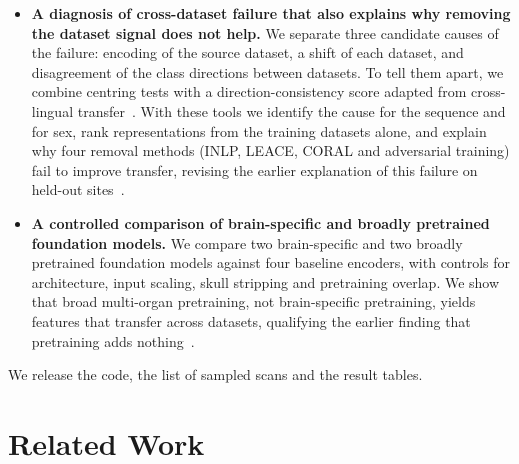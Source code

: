 \documentclass[11pt]{article}
\begin{document}
\begin{itemize}
  \item \textbf{A diagnosis of cross-dataset failure that also explains why
  removing the dataset signal does not help.} We separate three candidate
  causes of the failure: encoding of the source dataset, a shift of each
  dataset, and disagreement of the class directions between datasets. To tell
  them apart, we combine centring tests with a direction-consistency score
  adapted from cross-lingual transfer~\cite{muller_first_2021,
  deshpande_when_2022}. With these tools we identify the cause for the
  sequence and for sex, rank representations from the training datasets
  alone, and explain why four removal methods (INLP, LEACE, CORAL and
  adversarial training) fail to improve transfer, revising the earlier
  explanation of this failure on held-out sites~\cite{rahbar_frozen_2026}.
  \item \textbf{A controlled comparison of brain-specific and broadly
  pretrained foundation models.} We compare two brain-specific and two
  broadly pretrained foundation models against four baseline encoders, with
  controls for architecture, input scaling, skull stripping and pretraining
  overlap. We show that broad multi-organ pretraining, not brain-specific
  pretraining, yields features that transfer across datasets, qualifying the
  earlier finding that pretraining adds nothing~\cite{rahbar_frozen_2026}.
\end{itemize}

\noindent We release the code, the list of sampled scans and the result
tables.

\section{Related Work}
\end{document}
